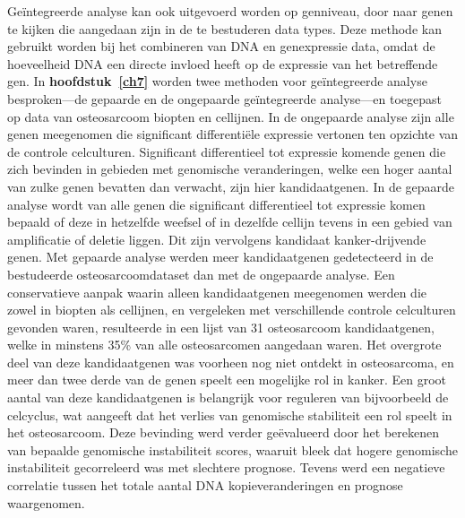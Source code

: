 Ge\"integreerde analyse kan ook uitgevoerd worden op genniveau, door naar genen te kijken die aangedaan zijn in de te bestuderen data types. Deze methode kan gebruikt worden bij het combineren van DNA en genexpressie data, omdat de hoeveelheid DNA een directe invloed heeft op de expressie van het betreffende gen. In {\bf hoofdstuk~\ref{ch7}} worden twee methoden voor ge\"integreerde analyse besproken---de gepaarde en de ongepaarde ge\"integreerde analyse---en toegepast op data van osteosarcoom biopten en cellijnen. In de ongepaarde analyse zijn alle genen meegenomen die significant differenti\"ele expressie vertonen ten opzichte van de controle celculturen. Significant differentieel tot expressie komende genen die zich bevinden in gebieden met genomische veranderingen, welke een hoger aantal van zulke genen bevatten dan verwacht, zijn hier kandidaatgenen. In de gepaarde analyse wordt van alle genen die significant differentieel tot expressie komen bepaald of deze in hetzelfde weefsel of in dezelfde cellijn tevens in een gebied van amplificatie of deletie liggen. Dit zijn vervolgens kandidaat kanker\hyp{}drijvende genen. Met gepaarde analyse werden meer kandidaatgenen gedetecteerd in de bestudeerde osteosarcoomdataset dan met de ongepaarde analyse. Een conservatieve aanpak waarin alleen kandidaatgenen meegenomen werden die zowel in biopten als cellijnen, en vergeleken met verschillende controle celculturen gevonden waren, resulteerde in een lijst van 31 osteosarcoom kandidaatgenen, welke in minstens 35\% van alle osteosarcomen aangedaan waren. Het overgrote deel van deze kandidaatgenen was voorheen nog niet ontdekt in osteosarcoma, en meer dan twee derde van de genen speelt een mogelijke rol in kanker. Een groot aantal van deze kandidaatgenen is belangrijk voor reguleren van bijvoorbeeld de celcyclus, wat aangeeft dat het verlies van genomische stabiliteit een rol speelt in het osteosarcoom. Deze bevinding werd verder ge\"evalueerd door het berekenen van bepaalde genomische instabiliteit scores, waaruit bleek dat hogere genomische instabiliteit gecorreleerd was met slechtere prognose. Tevens werd een negatieve correlatie tussen het totale aantal DNA kopieveranderingen en prognose waargenomen.

